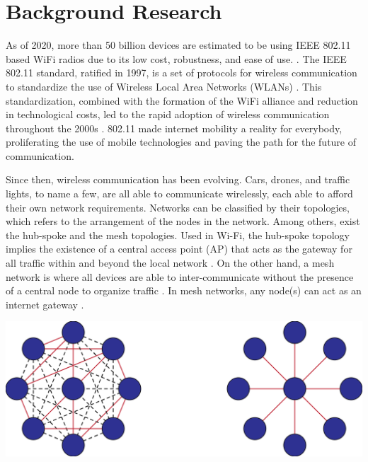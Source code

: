 
\section{Background Research}

As of 2020, more than 50 billion devices are estimated to be using IEEE 802.11 based WiFi radios due to its low cost, robustness, and ease of use. \cite{G_Davis_2018}. The IEEE 802.11 standard, ratified in 1997, is a set of protocols for wireless communication to standardize the use of Wireless Local Area Networks (WLANs) \cite{perahia2013next}. This standardization, combined with the formation of the WiFi alliance and reduction in technological costs, led to the rapid adoption of wireless communication throughout the 2000s \cite{perahia2013next}. 802.11 made internet mobility a reality for everybody, proliferating the use of mobile technologies and paving the path for the future of communication. 


Since then, wireless communication has been evolving. Cars, drones, and traffic lights, to name a few, are all able to communicate wirelessly, each able to afford their own network requirements. Networks can be classified by their topologies, which refers to the arrangement of the nodes in the network. Among others, exist the hub-spoke and the mesh topologies. Used in Wi-Fi, the hub-spoke topology implies the existence of a central access point (AP) that acts as the gateway for all traffic within and beyond the local network \cite{ti_lethaby2017wireless}. On the other hand, a mesh network is where all devices are able to inter-communicate without the presence of a central node to organize traffic \cite{ti_lethaby2017wireless}. In mesh networks, any node(s) can act as an internet gateway \cite{ti_lethaby2017wireless}. 

\begingroup
    \centering
    \medskip
    \includegraphics[width=0.5\columnwidth]{final-proposal/images/mesh_vs_hub_spoke.png}
    \label{fig:consensus_mesh}
\endgroup

